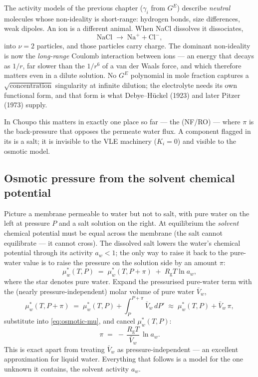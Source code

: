 \documentclass[11pt,a4paper]{article}
\newcommand{\Rgas}{R_{\!\mathrm{g}}}                %
\newcommand{\Gex}{G^{E}}
\begin{document}
The activity models of the previous chapter ($\gamma_i$ from $\Gex$)
describe \emph{neutral} molecules whose non-ideality is short-range:
hydrogen bonds, size differences, weak dipoles.  An ion is a different
animal.  When NaCl dissolves it dissociates,
\[
   \mathrm{NaCl} \;\longrightarrow\; \mathrm{Na}^{+} + \mathrm{Cl}^{-},
\]
into $\nu = 2$ particles, and those particles carry charge.  The
dominant non-ideality is now the \emph{long-range} Coulomb interaction
between ions --- an energy that decays as $1/r$, far slower than the
$1/r^6$ of a van der Waals force, and which therefore matters even in
a dilute solution.  No $\Gex$ polynomial in mole fraction captures a
$\sqrt{\text{concentration}}$ singularity at infinite dilution; the
electrolyte needs its own functional form, and that form is what
Debye--H\"uckel (1923) and later Pitzer (1973) \cite{Pitzer1973}
supply.

In Choupo this matters in exactly one place so far --- the
 (NF/RO) --- where $\pi$ is the back-pressure
that opposes the permeate water flux.  A component flagged
 in its  is a
salt; it is invisible to the VLE machinery ($K_i = 0$) and visible to
the osmotic model.

\subsection{Osmotic pressure from the solvent chemical potential}

Picture a membrane permeable to water but not to salt, with pure water
on the left at pressure $P$ and a salt solution on the right.  At
equilibrium the \emph{solvent} chemical potential must be equal across
the membrane (the salt cannot equilibrate --- it cannot cross).  The
dissolved salt lowers the water's chemical potential through its
activity $a_w < 1$; the only way to raise it back to the pure-water
value is to raise the pressure on the solution side by an amount
$\pi$:
\begin{equation}
   \mu_w^{*}(T, P) \;=\; \mu_w^{*}(T, P+\pi) \;+\; \Rgas T \ln a_w,
   \label{eq:osmotic-mu}
\end{equation}
where the star denotes pure water.  Expand the pressurised pure-water
term with the (nearly pressure-independent) molar volume of pure water
$\bar V_w$,
\[
   \mu_w^{*}(T, P+\pi) \;=\; \mu_w^{*}(T, P) + \int_{P}^{P+\pi}\!\bar V_w\,dP'
   \;\approx\; \mu_w^{*}(T, P) + \bar V_w\,\pi,
\]
substitute into \eqref{eq:osmotic-mu}, and cancel $\mu_w^{*}(T,P)$:
\begin{equation}
   \boxed{\;
   \pi \;=\; -\,\frac{\Rgas T}{\bar V_w}\,\ln a_w.
   \;}
   \label{eq:osmotic-exact}
\end{equation}
This is exact apart from treating $\bar V_w$ as pressure-independent
--- an excellent approximation for liquid water.  Everything that
follows is a model for the one unknown it contains, the solvent
activity $a_w$.
\end{document}
